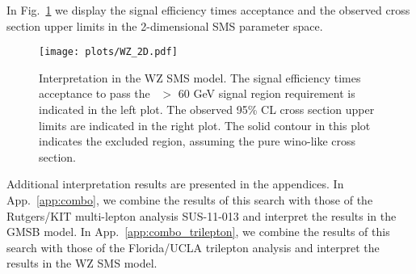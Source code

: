 In Fig.~\ref{fig:2Dlimits} we display the signal efficiency times acceptance and the observed cross section upper limits
in the 2-dimensional SMS parameter space.

\begin{figure}[th!]
  \begin{center}
    \texttt{[image: plots/WZ\_2D.pdf]}
    \caption{
      Interpretation in the WZ SMS model. %
      The signal efficiency times acceptance to pass the \MET\ $>$ 60 GeV signal region requirement is indicated in the left plot. %
      The observed 95\% CL cross section upper limits are indicated in the right plot. %
	  The solid contour in this plot
      indicates the excluded region, assuming the pure wino-like cross section.
      \label{fig:2Dlimits}
    }
  \end{center}
\end{figure}

Additional interpretation results are presented in the appendices.
In App.~\ref{app:combo}, we combine the results of this search with those of the Rutgers/KIT
multi-lepton analysis SUS-11-013 and interpret the results in the GMSB model.
In App.~\ref{app:combo_trilepton}, we combine the results of this search with those of the Florida/UCLA
trilepton analysis and interpret the results in the WZ SMS model.



%


